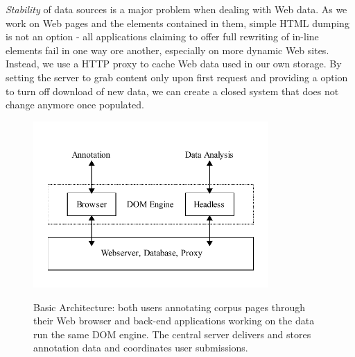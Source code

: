 \textit{Stability} of data sources is a major problem when dealing with Web data.
As we work on Web pages and the elements contained in them, simple HTML dumping is not an option - all applications claiming to offer full rewriting of in-line elements fail in one way ore another, especially on more dynamic Web sites.
Instead, we use a HTTP proxy to cache Web data used in our own storage.
By setting the server to grab content only upon first request and providing a option to turn off download of new data, we can create a closed system that does not change anymore once populated.

\begin{figure}
	{\includegraphics[width=0.8\textwidth]{arch}}
\caption{\label{f:arch}Basic {\KrdWrd} Architecture: both users annotating corpus pages through their Web browser
and back-end applications working on the data run the same DOM engine.
	The central server delivers and stores annotation data and coordinates user submissions.}
\end{figure}


